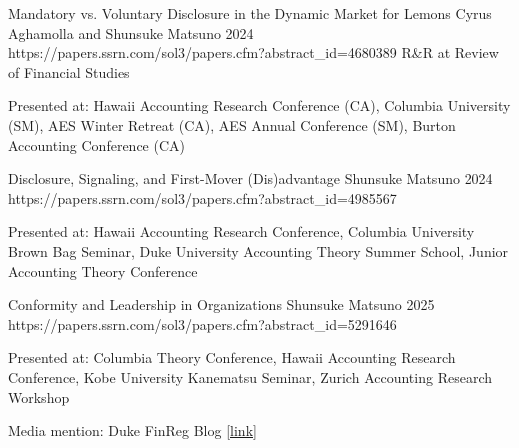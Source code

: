 

\paperentry
	{Mandatory vs. Voluntary Disclosure in the Dynamic Market for Lemons}   %
	{Cyrus Aghamolla and Shunsuke Matsuno}   %
	{2024}   %
	{https://papers.ssrn.com/sol3/papers.cfm?abstract_id=4680389}  %
	{}   %
	{R\&R at Review of Financial Studies}   %
	{
	\begin{cvitems}  %
		\item {Presented at: Hawaii Accounting Research Conference (CA), Columbia University (SM), AES Winter Retreat (CA), AES Annual Conference (SM), Burton Accounting Conference (CA)}			
	\end{cvitems}
	}

\paperentry
	{Disclosure, Signaling, and First-Mover (Dis)advantage}   %
	{Shunsuke Matsuno}   %
	{2024}
	{https://papers.ssrn.com/sol3/papers.cfm?abstract_id=4985567}  %
	{}   %
	{}   %
	{
	\begin{cvitems}  %
		\item {Presented at: Hawaii Accounting Research Conference, Columbia University Brown Bag Seminar, Duke University Accounting Theory Summer School, Junior Accounting Theory Conference}
	\end{cvitems}
	}

\paperentry
	{Conformity and Leadership in Organizations}
	{Shunsuke Matsuno}
	{2025}
	{https://papers.ssrn.com/sol3/papers.cfm?abstract_id=5291646}
	{}
	{}
	{
	\begin{cvitems} %
		\item {Presented at: Columbia Theory Conference, Hawaii Accounting Research Conference, Kobe University Kanematsu Seminar, Zurich Accounting Research Workshop}
		\item {Media mention: Duke FinReg Blog \href{https://sites.duke.edu/thefinregblog/2024/10/29/mandatory-vs-voluntary-disclosure-in-the-dynamic-market-for-lemons/}{[link]}}
	\end{cvitems}
	}

\vspace{.3cm}

